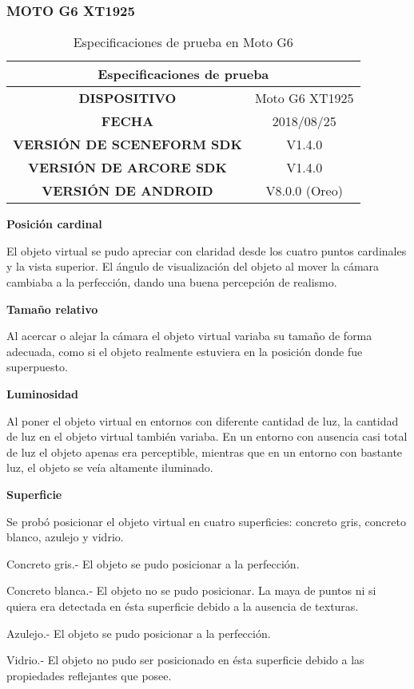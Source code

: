 \subsubsection{MOTO G6 XT1925}
\begin{table}[!h]
	\centering
	\begin{tabular}{|c|c|}
		\hline
		\multicolumn{2}{|c|}{Especificaciones de prueba}   \\ \hline
		\textbf{DISPOSITIVO}              & Moto G6 XT1925 \\ \hline
		\textbf{FECHA}                    & 2018/08/25     \\ \hline
		\textbf{VERSIÓN DE SCENEFORM SDK} & V1.4.0         \\ \hline
		\textbf{VERSIÓN DE ARCORE SDK}    & V1.4.0         \\ \hline
		\textbf{VERSIÓN DE ANDROID}       & V8.0.0 (Oreo)  \\ \hline
	\end{tabular}
	\captionsetup{justification=centering}
	\caption{Especificaciones de prueba en Moto G6}
\end{table}

\textbf{Posición cardinal} \par
El objeto virtual se pudo apreciar con claridad desde los cuatro puntos cardinales y la vista superior. El ángulo de visualización del objeto al mover la cámara cambiaba a la perfección, dando una buena percepción de realismo.



\textbf{Tamaño relativo} \par
Al acercar o alejar la cámara el objeto virtual variaba su tamaño de forma adecuada, como si el objeto realmente estuviera en la posición donde fue superpuesto.


\textbf{Luminosidad} \par
Al poner el objeto virtual en entornos con diferente cantidad de luz, la cantidad de luz en el objeto virtual también variaba. En un entorno con ausencia casi total de luz el objeto apenas era perceptible, mientras que en un entorno con bastante luz, el objeto se veía altamente iluminado.


\textbf{Superficie} \par
Se probó posicionar el objeto virtual en cuatro superficies: concreto gris, concreto blanco, azulejo y vidrio.\par
Concreto gris.- El objeto se pudo posicionar a la perfección.\par
Concreto blanca.- El objeto no se pudo posicionar. La maya de puntos ni si quiera era detectada en ésta superficie debido a la ausencia de texturas.\par
Azulejo.- El objeto se pudo posicionar a la perfección.\par
Vidrio.- El objeto no pudo ser posicionado en ésta superficie debido a las propiedades reflejantes que posee.\par

